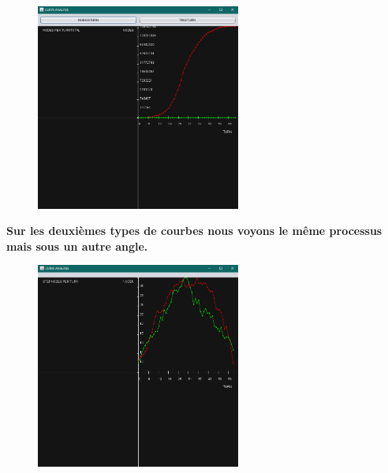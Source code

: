 \begin{figure}[!ht]
\begin{center}
\includegraphics[width=0.60\textwidth]{./NODESPERTURN4}
\end{center}
\end{figure}
\newpage

\textbf{Sur les deuxièmes types de courbes nous voyons le même processus mais sous un autre angle.}

\begin{figure}[!ht]
\begin{center}
\includegraphics[width=0.60\textwidth]{./STEPNODESPERTURN0}
\end{center}
\end{figure}

